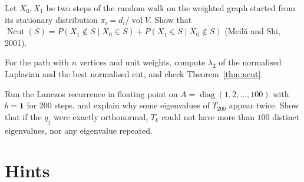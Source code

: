 \begin{exercise}[$\star\star$]\label{ex:ncutwalk}
Let $X_0,X_1$ be two steps of the random walk on the weighted graph started from its stationary distribution $\pi_i=d_i/\operatorname{vol}V$. Show that
$\operatorname{Ncut}(S)=P(X_1\notin S\mid X_0\in S)+P(X_1\in S\mid X_0\notin S)$ (Meil\u{a} and Shi, 2001).
\end{exercise}

\begin{exercise}[$\star\star$]\label{ex:ncutpath}
For the path with $n$ vertices and unit weights, compute $\lambda_2$ of the normalised Laplacian and the best normalised cut, and check Theorem~\ref{thm:ncut}.
\end{exercise}

\begin{exercise}[$\star\star$]\label{ex:ghosts}
Run the Lanczos recurrence in floating point on $A=\operatorname{diag}(1,2,\dots,100)$ with $b=\mathbf1$ for $200$ steps, and explain why some eigenvalues of $T_{200}$ appear twice.
Show that if the $q_j$ were exactly orthonormal, $T_k$ could not have more than $100$ distinct eigenvalues, nor any eigenvalue repeated.
\end{exercise}

\section{Hints}

